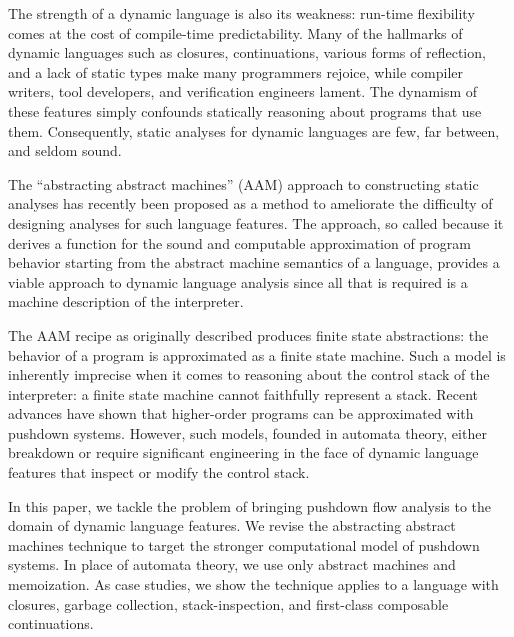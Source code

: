 The strength of a dynamic language is also its weakness: run-time
flexibility comes at the cost of compile-time predictability.
%
Many of the hallmarks of dynamic languages such as closures,
continuations, various forms of reflection, and a lack of static types
make many programmers rejoice, while compiler writers, tool
developers, and verification engineers lament.
%
The dynamism of these features simply confounds statically reasoning
about programs that use them.
%
Consequently, static analyses for dynamic languages are few, far
between, and seldom sound.

The ``abstracting abstract machines'' (AAM) approach to constructing
static analyses has recently been proposed as a method to ameliorate
the difficulty of designing analyses for such language features.
%
The approach, so called because it derives a function for the sound
and computable approximation of program behavior starting from the
abstract machine semantics of a language, provides a viable approach
to dynamic language analysis since all that is required is a machine
description of the interpreter.


The AAM recipe as originally described produces finite state
abstractions: the behavior of a program is approximated as a finite
state machine.
%
Such a model is inherently imprecise when it comes to reasoning about
the control stack of the interpreter: a finite state machine cannot
faithfully represent a stack.
%
Recent advances have shown that higher-order programs can be
approximated with pushdown systems.
%
However, such models, founded in automata theory, either breakdown or
require significant engineering in the face of dynamic language
features that inspect or modify the control stack.

In this paper, we tackle the problem of bringing pushdown flow
analysis to the domain of dynamic language features.  We revise the
abstracting abstract machines technique to target the stronger
computational model of pushdown systems.
%
In place of automata theory, we use only abstract machines and
memoization.
%
As case studies, we show the technique applies to a language with
closures, garbage collection, stack-inspection, and first-class
composable continuations.
